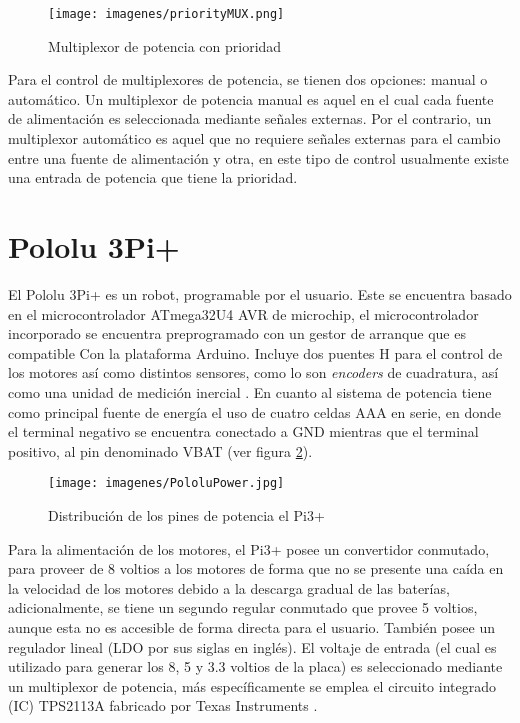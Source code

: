 \begin{figure}[H]
    \centering
    \texttt{[image: imagenes/priorityMUX.png]}
    \caption{Multiplexor de potencia con prioridad \cite{triano_basics_2020}}
    \label{fig:priorityMux}
\end{figure}

Para el control de multiplexores de potencia, se tienen dos opciones: manual o automático. Un multiplexor de
potencia manual es aquel en el cual cada fuente de alimentación es seleccionada mediante señales externas. Por el contrario, un multiplexor automático es aquel que no requiere señales externas para el cambio entre 
una fuente de alimentación y otra, en este tipo de control usualmente existe una entrada de potencia que 
tiene la prioridad.

\section{Pololu 3Pi+}

El Pololu 3Pi+ es un robot, programable por el usuario. Este se encuentra basado en el microcontrolador ATmega32U4 AVR
de microchip, el microcontrolador incorporado se encuentra preprogramado con un gestor de arranque que es compatible
 Con la plataforma Arduino. Incluye dos puentes H para el control de los motores así como distintos sensores, como lo 
 son \textit{encoders} de cuadratura, así como una unidad de medición inercial \cite{noauthor_pololu_nodate}. En cuanto 
 al sistema de potencia tiene como principal fuente de energía el uso de cuatro celdas AAA en serie, en donde el 
 terminal negativo se encuentra conectado a GND mientras que el terminal positivo, al pin denominado VBAT (ver figura
 \ref{fig:power}).

 \begin{figure}[H]
    \centering
    \texttt{[image: imagenes/PololuPower.jpg]}
    \caption{Distribución de los pines de potencia el Pi3+ \cite{noauthor_pololu_nodate}}
    \label{fig:power}
 \end{figure}

 Para la alimentación de los motores, el Pi3+ posee un convertidor conmutado, para proveer de 8 voltios a los motores
 de forma que no se presente una caída en la velocidad de los motores debido a la descarga gradual de las baterías,
 adicionalmente, se tiene un segundo regular conmutado que provee 5 voltios, aunque esta no es accesible de forma directa
 para el usuario. También posee un regulador lineal (LDO por sus siglas en inglés). El voltaje de entrada (el cual es 
 utilizado para generar los 8, 5 y 3.3 voltios de la placa) es seleccionado mediante un multiplexor de potencia, más 
 específicamente se emplea el circuito integrado (IC) TPS2113A fabricado por Texas Instruments \cite{noauthor_pololu_nodate}.

